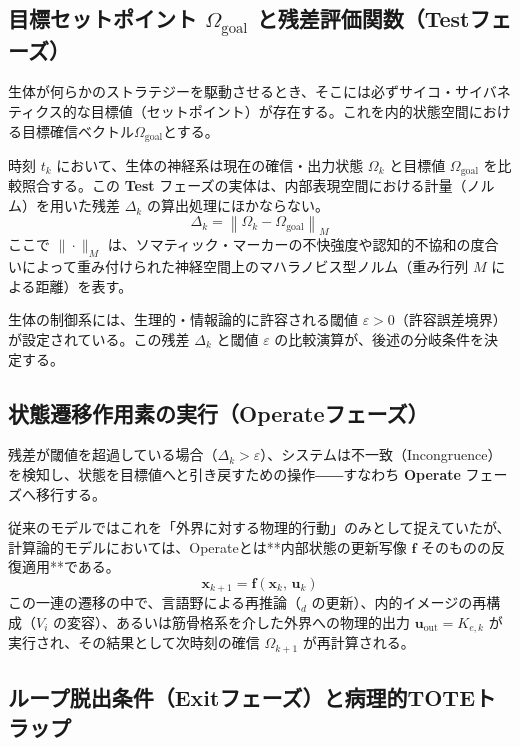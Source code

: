 \subsection{目標セットポイント $\Omega_{\mathrm{goal}}$ と残差評価関数（Testフェーズ）}

生体が何らかのストラテジーを駆動させるとき、そこには必ずサイコ・サイバネティクス的な目標値（セットポイント）が存在する。これを内的状態空間における目標確信ベクトル$\Omega_{\mathrm{goal}}$とする。

時刻 $t_k$ において、生体の神経系は現在の確信・出力状態 $\Omega_k$ と目標値 $\Omega_{\mathrm{goal}}$ を比較照合する。この \textbf{Test} フェーズの実体は、内部表現空間における計量（ノルム）を用いた残差 $\Delta_k$ の算出処理にほかならない。
\begin{equation}
    \Delta_k = \left\| \Omega_k - \Omega_{\mathrm{goal}} \right\|_M
\end{equation}
ここで $\|\cdot\|_M$ は、ソマティック・マーカーの不快強度や認知的不協和の度合いによって重み付けられた神経空間上のマハラノビス型ノルム（重み行列 $M$ による距離）を表す。

生体の制御系には、生理的・情報論的に許容される閾値 $\varepsilon > 0$（許容誤差境界）が設定されている。この残差 $\Delta_k$ と閾値 $\varepsilon$ の比較演算が、後述の分岐条件を決定する。

\subsection{状態遷移作用素の実行（Operateフェーズ）}

残差が閾値を超過している場合（$\Delta_k > \varepsilon$）、システムは不一致（Incongruence）を検知し、状態を目標値へと引き戻すための操作――すなわち \textbf{Operate} フェーズへ移行する。

従来のモデルではこれを「外界に対する物理的行動」のみとして捉えていたが、計算論的モデルにおいては、Operateとは**内部状態の更新写像 $\boldsymbol{f}$ そのものの反復適用**である。
\begin{equation}
    \boldsymbol{x}_{k+1} = \boldsymbol{f}\left( \boldsymbol{x}_k, \, \boldsymbol{u}_k \right)
\end{equation}
この一連の遷移の中で、言語野による再推論（$_d$ の更新）、内的イメージの再構成（$V_i$ の変容）、あるいは筋骨格系を介した外界への物理的出力 $\boldsymbol{u}_{\mathrm{out}} = K_{e,k}$ が実行され、その結果として次時刻の確信 $\Omega_{k+1}$ が再計算される。

\subsection{ループ脱出条件（Exitフェーズ）と病理的TOTEトラップ}

